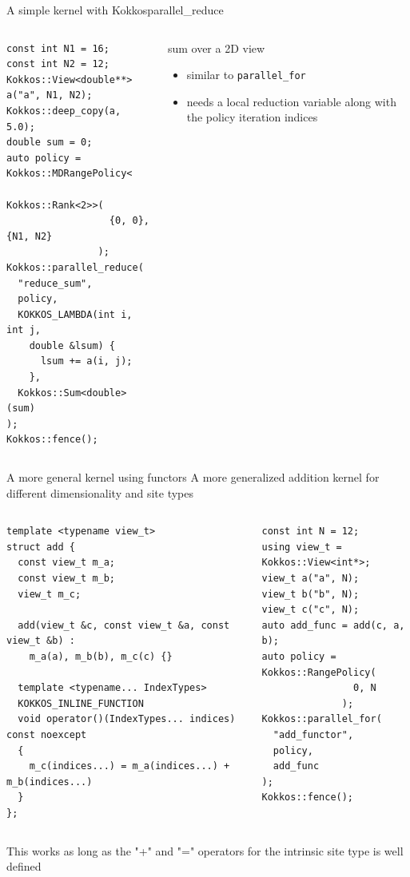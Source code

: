 \begin{frame}[fragile]{A simple kernel with Kokkos}{parallel\_reduce}
  \begin{columns}
      \begin{verbatim}
const int N1 = 16;
const int N2 = 12;
Kokkos::View<double**> a("a", N1, N2);
Kokkos::deep_copy(a, 5.0);
double sum = 0;
auto policy = Kokkos::MDRangePolicy<
                Kokkos::Rank<2>>(
                  {0, 0}, {N1, N2}
                );
Kokkos::parallel_reduce(
  "reduce_sum",
  policy,
  KOKKOS_LAMBDA(int i, int j, 
    double &lsum) {
      lsum += a(i, j);
    },
  Kokkos::Sum<double>(sum)
);
Kokkos::fence();
      \end{verbatim}
      \begin{block}{sum over a 2D view}
        \begin{itemize}
          \item similar to \verb|parallel_for|
          \item needs a local reduction variable along with the policy iteration indices
        \end{itemize}
      \end{block}
    \end{columns}
\end{frame}

\begin{frame}[fragile]{A more general kernel using functors}
  A more generalized addition kernel for different dimensionality and site types
  \begin{columns}
      \begin{verbatim}
template <typename view_t>
struct add {
  const view_t m_a;
  const view_t m_b;
  view_t m_c;

  add(view_t &c, const view_t &a, const view_t &b) :
    m_a(a), m_b(b), m_c(c) {}
  
  template <typename... IndexTypes>
  KOKKOS_INLINE_FUNCTION
  void operator()(IndexTypes... indices) const noexcept
  {
    m_c(indices...) = m_a(indices...) + m_b(indices...)
  }
};
      \end{verbatim}
      \begin{verbatim}
const int N = 12;
using view_t = Kokkos::View<int*>;
view_t a("a", N);
view_t b("b", N);
view_t c("c", N);
auto add_func = add(c, a, b);
auto policy = Kokkos::RangePolicy(
                0, N
              );
Kokkos::parallel_for(
  "add_functor",
  policy,
  add_func
);
Kokkos::fence();
      \end{verbatim}
  \end{columns}

  This works as long as the "+" and "=" operators for the intrinsic site type is well defined
\end{frame}

